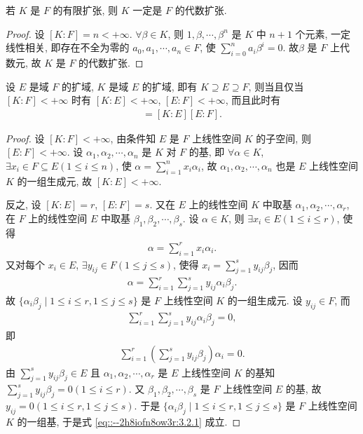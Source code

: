 \documentclass[../../main.tex]{subfiles}%
\begin{document}
\begin{corollary}
若 $K$ 是 $F$ 的有限扩张, 则 $K$ 一定是 $F$ 的代数扩张.
\end{corollary}
\begin{proof}
设 $[K:F]=n<+\infty$. $\forall \beta\in K$, 则 $1,\beta,\cdots,\beta^n$ 是 $K$ 中 $n+1$ 个元素, 一定线性相关, 即存在不全为零的 $a_0,a_1,\cdots,a_n\in F$, 使 $\sum\limits_{i=0}^{n}a_i\beta^i=0$. 故$\beta$ 是 $F$ 上代数元, 故 $K$ 是 $F$ 的代数扩张.

\end{proof}

\begin{theorem}\label{theorem:定理3.2.2--抽象代数}
设 $E$ 是域 $F$ 的扩域, $K$ 是域 $E$ 的扩域, 即有 $K\supseteq E\supseteq F$, 则当且仅当 $[K:F]<+\infty$ 时有 $[K:E]<+\infty$, $[E:F]<+\infty$, 而且此时有
\begin{align}
[K:F]=[K:E][E:F].\label{eq::--2h8iofn8ow3r:3.2.1}
\end{align}
\end{theorem}
\begin{proof}
设 $[K:F]<+\infty$, 由条件知 $E$ 是 $F$ 上线性空间 $K$ 的子空间, 则$[E:F]<+\infty$. 设 $\alpha_1,\alpha_2,\cdots,\alpha_n$ 是 $K$ 对 $F$ 的基, 即 $\forall \alpha\in K$, $\exists x_i\in F\subseteq E(1\leqslant i\leqslant n)$, 使 $\alpha=\sum\limits_{i=1}^{n}x_i\alpha_i$, 故 $\alpha_1,\alpha_2,\cdots,\alpha_n$ 也是 $E$ 上线性空间 $K$ 的一组生成元, 故 $[K:E]<+\infty$.

反之, 设 $[K:E]=r$, $[E:F]=s$. 又在 $E$ 上的线性空间 $K$ 中取基 $\alpha_1,\alpha_2,\cdots,\alpha_r$, 在 $F$ 上的线性空间 $E$ 中取基 $\beta_1,\beta_2,\cdots,\beta_s$. 设 $\alpha\in K$, 则 $\exists x_i\in E(1\leqslant i\leqslant r)$, 使得
\begin{align*}
\alpha=\sum\limits_{i=1}^{r}x_i\alpha_i.
\end{align*}
又对每个 $x_i\in E$, $\exists y_{ij}\in F(1\leqslant j\leqslant s)$, 使得 $x_i=\sum\limits_{j=1}^{s}y_{ij}\beta_j$, 因而
\begin{align*}
\alpha=\sum\limits_{i=1}^{r}\sum\limits_{j=1}^{s}y_{ij}\alpha_i\beta_j.
\end{align*}
故 $\{\alpha_i\beta_j\mid 1\leqslant i\leqslant r,1\leqslant j\leqslant s\}$ 是 $F$ 上线性空间 $K$ 的一组生成元. 设 $y_{ij}\in F$, 而
\begin{align*}
\sum\limits_{i=1}^{r}\sum\limits_{j=1}^{s}y_{ij}\alpha_i\beta_j=0,
\end{align*}
即
\begin{align*}
\sum\limits_{i=1}^{r}\left(\sum\limits_{j=1}^{s}y_{ij}\beta_j\right)\alpha_i=0.
\end{align*}
由 $\sum\limits_{j=1}^{s}y_{ij}\beta_j\in E$ 且 $\alpha_1,\alpha_2,\cdots,\alpha_r$ 是 $E$ 上线性空间 $K$ 的基知 $\sum\limits_{j=1}^{s}y_{ij}\beta_j=0(1\leqslant i\leqslant r)$. 又 $\beta_1,\beta_2,\cdots,\beta_s$ 是 $F$ 上线性空间 $E$ 的基, 故 $y_{ij}=0(1\leqslant i\leqslant r,1\leqslant j\leqslant s)$. 于是 $\{\alpha_i\beta_j\mid 1\leqslant i\leqslant r,1\leqslant j\leqslant s\}$ 是 $F$ 上线性空间 $K$ 的一组基, 于是式 \eqref{eq::--2h8iofn8ow3r:3.2.1} 成立.

\end{proof}
\end{document}
